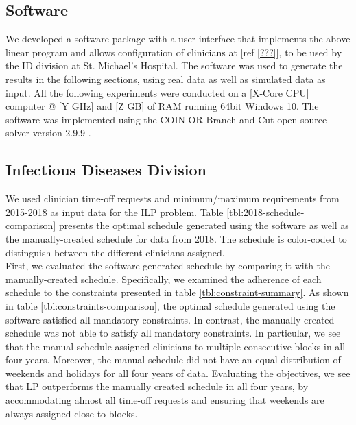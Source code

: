 \subsection{Software}
We developed a software package with a user interface that implements the above linear program and allows configuration of clinicians at [ref \ref{???}], to be used by the ID division at St. Michael's Hospital. The software was used to generate the results in the following sections, using real data as well as simulated data as input. All the following experiments were conducted on a [X-Core CPU] computer @ [Y GHz] and [Z GB] of RAM running 64bit Windows 10. The software was implemented using the COIN-OR Branch-and-Cut open source solver version 2.9.9 \cite{johnjforrest_coin-or/cbc:_2019}.

\subsection{Infectious Diseases Division}  %
We used clinician time-off requests and minimum/maximum requirements from 2015-2018 as input data for the ILP problem. Table \ref{tbl:2018-schedule-comparison} presents the optimal schedule generated using the software as well as the manually-created schedule for data from 2018. The schedule is color-coded to distinguish between the different clinicians assigned. \\



First, we evaluated the software-generated schedule by comparing it with the manually-created schedule. Specifically, we examined the adherence of each schedule to the constraints presented in table \ref{tbl:constraint-summary}. As shown in table \ref{tbl:constraints-comparison}, the optimal schedule generated using the software satisfied all mandatory constraints. In contrast, the manually-created schedule was not able to satisfy all mandatory constraints. In particular, we see that the manual schedule assigned clinicians to multiple consecutive blocks in all four years. Moreover, the manual schedule did not have an equal distribution of weekends and holidays for all four years of data. Evaluating the objectives, we see that LP outperforms the manually created schedule in all four years, by accommodating almost all time-off requests and ensuring that weekends are always assigned close to blocks. \\



